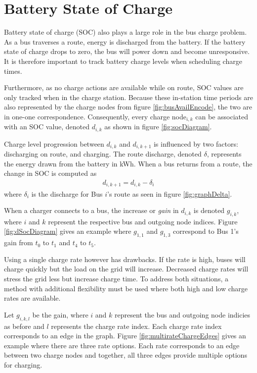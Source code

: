 \section{Battery State of Charge}
Battery state of charge (SOC) also plays a large role in the bus charge problem. As a bus traverses a route, energy is discharged from the battery. If the battery state of charge drops to zero, the bus will power down and become unresponsive. It is therefore important to track battery charge levels when scheduling charge times.
\par Furthermore, as no charge actions are available while on route, SOC values are only tracked when in the charge station. Because these in-station time periods are also represented by the charge nodes from figure \ref{fig:busAvailEncode}, the two are in one-one correspondence. Consequently, every charge node$_{i,k}$ can be associated with an SOC value, denoted $d_{i,k}$ as shown in figure \ref{fig:socDiagram}.  

\par Charge level progression between $d_{i,k}$ and $d_{i,k+1}$ is influenced by two factors: discharging on route, and charging. The route discharge, denoted $\delta$, represents the energy drawn from the battery in kWh.  When a bus returns from a route, the change in SOC is computed as 
\begin{align}
	d_{i,k+1} = d_{i,k} - \delta_i
\end{align}
where $\delta_i$ is the discharge for Bus $i$'s route as seen in figure \ref{fig:graphDelta}.  

\par When a charger connects to a bus, the increase or \textit{gain} in $d_{i,k}$ is denoted $g_{i,k}$, where $i$ and $k$ represent the respective bus and outgoing node indices. Figure \ref{fig:dSocDiagram} gives an example where $g_{1,1}$ and $g_{1,3}$ correspond to Bus 1's gain from $t_0$ to $t_1$ and $t_4$ to $t_5$.  

Using a single charge rate however has drawbacks. If the rate is high, buses will charge quickly but the load on the grid will increase.  Decreased charge rates will stress the grid less but increase charge time. To address both situations, a method with additional flexibility must be used where both high and low charge rates are available. 
\par Let $g_{i,k,l}$ be the gain, where $i$ and $k$ represent the bus and outgoing node indicies as before and $l$ represents the charge rate index. Each charge rate index corresponds to an edge in the graph. Figure \ref{fig:multirateChargeEdges} gives an example where there are three rate options. Each rate corresponds to an edge between two charge nodes and together, all three edges provide multiple options for charging.
